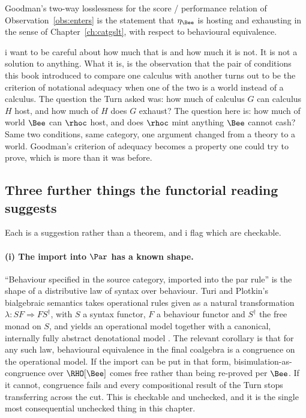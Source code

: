 \begin{observation}
\label{obs:hosting}
Goodman's two-way losslessness for the score / performance relation
of Observation~\ref{obs:enters} is the statement that $\eta_{\Bee}$
is hosting and exhausting in the sense of
Chapter~\ref{ch:catgslt}, with respect to behavioural equivalence.
\end{observation}

\noindent
i want to be careful about how much that is and how much it is not.
It is not a solution to anything.
What it is, is the observation that the pair of conditions this
book introduced to compare one calculus with another turns out to
be the criterion of notational adequacy when one of the two is a
world instead of a calculus.
The question the Turn asked was: how much of calculus $G$ can
calculus $H$ host, and how much of $H$ does $G$ exhaust?
The question here is: how much of world $\Bee$ can $\rhoc$ host,
and does $\rhoc$ mint anything $\Bee$ cannot cash?
Same two conditions, same category, one argument changed from a
theory to a world.
Goodman's criterion of adequacy becomes a property one could try to
prove, which is more than it was before.

\subsection{Three further things the functorial reading suggests}
\label{sec:suggests}

Each is a suggestion rather than a theorem, and i flag which are
checkable.

\paragraph{(i) The import into $\Par$ has a known shape.}
``Behaviour specified in the source category, imported into the par
rule'' is the shape of a distributive law of syntax over behaviour.
Turi and Plotkin's bialgebraic semantics takes operational rules
given as a natural transformation $\lambda : SF \Rightarrow
FS^{\dagger}$, with $S$ a syntax functor, $F$ a behaviour functor
and $S^{\dagger}$ the free monad on $S$, and yields an operational
model together with a canonical, internally fully abstract
denotational model \cite{turiplotkin}.
The relevant corollary is that for any such law, behavioural
equivalence in the final coalgebra is a congruence on the
operational model.
If the import can be put in that form, bisimulation-as-congruence
over $\RHO[\Bee]$ comes free rather than being re-proved per
$\Bee$.
If it cannot, congruence fails and every compositional result of
the Turn stops transferring across the cut.
This is checkable and unchecked, and it is the single most
consequential unchecked thing in this chapter.

